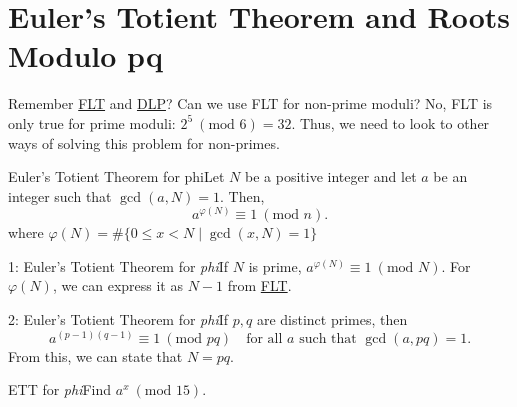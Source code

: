 \section{Euler's Totient Theorem and Roots Modulo pq}

\renewcommand{\theenumi}{\arabic{enumi}}
\renewcommand{\labelenumi}{\theenumi.}

Remember \hyperref[thm:Fermat's Little Theorem]{FLT} and \hyperref[Discrete Logarithm Problem]{DLP}? Can we use FLT for non-prime moduli? No, FLT is only true for prime moduli: \(2^5 \ (\text{mod 6}) = 32 \). Thus, we need to look to other ways of solving this problem for non-primes.

\begin{theorem}
    {Euler's Totient Theorem for phi}Let \(N\) be a positive integer and let \(a\) be an integer such that \(\gcd(a, N) = 1\). Then, \[
        a^{\varphi(N)} \equiv 1 \ (\text{mod }{n}).
    \] where \(\varphi(N) = \#\{0 \leq x < N \mid \gcd(x,N) = 1\}\)
\end{theorem}

\begin{corollary}
    {1: Euler's Totient Theorem for \textit{phi}}If \(N\) is prime, \(a^{\varphi(N)} \equiv 1 \ (\text{mod } N)\). For \(\varphi(N)\), we can express it as \(N-1\) from \hyperref[thm:Fermat's Little Theorem]{FLT}.
\end{corollary}


\begin{corollary}
    {2: Euler's Totient Theorem for \textit{phi}}If \(p,q\) are distinct primes, then \[
        a^{(p-1)(q-1)} \equiv 1 \ (\text{mod } pq) \quad \text{for all } a  \text{ such that } \gcd(a, pq) = 1.
    \] From this, we can state that \(N = pq\).
\end{corollary}


\begin{example}
    {ETT for \textit{phi}}Find \(a^x \ (\text{mod } 15)\).
\end{example}



